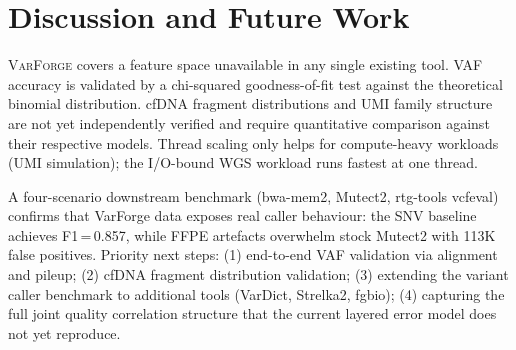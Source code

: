 \documentclass[10pt, twocolumn]{article}
\newcommand{\varforge}{\textsc{VarForge}\xspace}
\begin{document}
\section{Discussion and Future Work}

\varforge{} covers a feature space unavailable in any single existing tool.
VAF accuracy is validated by a chi-squared goodness-of-fit test against the theoretical binomial distribution.
cfDNA fragment distributions and UMI family structure are not yet independently verified and require quantitative comparison against their respective models.
Thread scaling only helps for compute-heavy workloads (UMI simulation); the I/O-bound WGS workload runs fastest at one thread.

A four-scenario downstream benchmark (bwa-mem2, Mutect2, rtg-tools vcfeval) confirms that VarForge data exposes real caller behaviour: the SNV baseline achieves F1\,=\,0.857, while FFPE artefacts overwhelm stock Mutect2 with 113K false positives.
Priority next steps: (1) end-to-end VAF validation via alignment and pileup; (2) cfDNA fragment distribution validation; (3) extending the variant caller benchmark to additional tools (VarDict, Strelka2, fgbio); (4) capturing the full joint quality correlation structure that the current layered error model does not yet reproduce.

\printbibliography[heading=bibintoc, title={References}]
\end{document}
